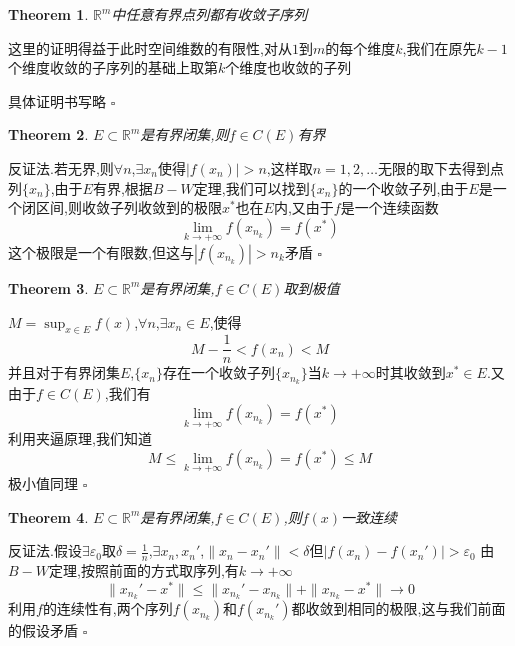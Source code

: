 \documentclass[11pt,hyperref,a4paper,UTF8]{ctexart}
\newtheorem{theorem}{Theorem}[subsection]
\newenvironment{cproof}{%
\heiti{证明}\kaishu
}{%
  \hfill $\square$
  \par\bigskip
}
\newcommand{\RR}{\mathbb{R}}
\begin{document}
\begin{CJK}{UTF8}{gkai}
\begin{theorem}
  $\RR^m$中任意有界点列都有收敛子序列
\end{theorem}

\begin{cproof}
  这里的证明得益于此时空间维数的有限性,对从$1$到$m$的每个维度$k$,我们在原先$k - 1$个维度收敛的子序列的基础上取第$k$个维度也收敛的子列

  具体证明书写略
\end{cproof}

\begin{theorem}
  $E \subset \RR^m$是有界闭集,则$f\in C(E)$有界
\end{theorem}

\begin{cproof}
  反证法.若无界,则$\forall n$,$\exists x_n$使得$|f(x_n)| > n$,这样取$n = 1,2,\ldots$无限的取下去得到点列$\{x_n\}$,由于$E$有界,根据$B-W$定理,我们可以找到$\{x_n\}$的一个收敛子列,由于$E$是一个闭区间,则收敛子列收敛到的极限$x^\ast$也在$E$内,又由于$f$是一个连续函数
  \[\lim_{k\to +\infty} f(x_{n_k}) = f(x^\ast)\]
  这个极限是一个有限数,但这与$|f(x_{n_k})| > n_k$矛盾
\end{cproof}

\begin{theorem}
  $E\subset \RR^m$是有界闭集,$f\in C(E)$取到极值
\end{theorem}

\begin{cproof}
  $M = \sup_{x \in E} f(x)$,$\forall n$,$\exists x_n \in E$,使得
  \[M - \frac{1}{n} < f(x_n) < M\]
  并且对于有界闭集$E$,$\{x_n\}$存在一个收敛子列$\{x_{n_k}\}$当$k \to +\infty$时其收敛到$x^\ast \in E$.又由于$f\in C(E)$,我们有
  \[\lim_{k\to +\infty} f(x_{n_k}) = f(x^\ast)\]
  利用夹逼原理,我们知道
  \[M \leq \lim_{k\to +\infty} f(x_{n_k}) = f(x^\ast) \leq M\]
  极小值同理
\end{cproof}

\begin{theorem}
  $E \subset \RR^m$是有界闭集,$f\in C(E)$,则$f(x)$一致连续
\end{theorem}

\begin{cproof}
  反证法.假设$\exists \varepsilon_0$取$\delta = \frac{1}{n}$,$\exists x_n,x_n'$,$\|x_n - x_n'\| < \delta$但$|f(x_n) - f(x_n')| > \varepsilon_0$
  由$B-W$定理,按照前面的方式取序列,有$k\to +\infty$
  \[\|x_{n_k}' - x^\ast\| \leq \|x_{n_k}' - x_{n_k}\| + \|x_{n_k} - x^\ast\| \to 0\]
  利用$f$的连续性有,两个序列$f(x_{n_k})$和$f(x_{n_k}')$都收敛到相同的极限,这与我们前面的假设矛盾
\end{cproof}


\end{CJK}
\end{document}
